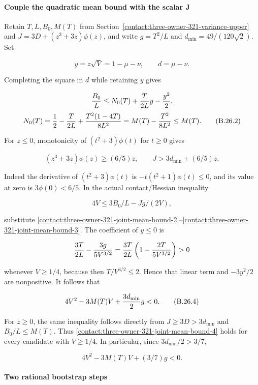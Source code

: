 \paragraph{Couple the quadratic mean bound with the scalar J}

Retain $T,L,B_0,M(T)$ from Section~\ref{contact:three-owner-321-variance-upper} and
$J=3D+(z^3+3z)\phi(z)$, and write $g=T^2/L$ and
$d_{\min}=49/(120\sqrt{2})$. Set

\[
 y=z\sqrt V=1-\mu-\nu,\qquad d=\mu-\nu.
\]

Completing the square in $d$ while retaining $y$ gives

\[
 {B_0\over L}\le N_0(T)+{T\over2L}y-{y^2\over2},
\]
\[
 N_0(T)={1\over2}-{T\over2L}+{T^2(1-4T)\over8L^2}
 =M(T)-{T^2\over8L^2}\le M(T).
\tag{B.26.2}\label{contact:three-owner-321-joint-mean-bound-2}
\]

For $z\le 0$, monotonicity of $(t^2+3)\phi(t)$ for $t\ge 0$ gives

\[
 (z^3+3z)\phi(z)\ge(6/5)z,
 \qquad J>3d_{\min}+(6/5)z.
\tag{B.26.3}\label{contact:three-owner-321-joint-mean-bound-3}
\]

Indeed the derivative of $(t^2+3)\phi(t)$ is
$-t(t^2+1)\phi(t)\le 0$, and its value at zero is $3\phi(0)<6/5$.
In the actual contact/Hessian inequality

\[
 4V\le3B_0/L-Jg/(2V),
\]

substitute \eqref{contact:three-owner-321-joint-mean-bound-2}--\eqref{contact:three-owner-321-joint-mean-bound-3}. The coefficient of $y\le 0$ is

\[
 {3T\over2L}-{3g\over5V^{3/2}}
 ={3T\over2L}\left(1-{2T\over5V^{3/2}}\right)>0
\]

whenever $V\ge 1/4$, because then $T/V^{3/2}\le 2$. Hence that linear term
and $-3y^2/2$ are nonpositive. It follows that

\[
 4V^2-3M(T)V+{3d_{\min}\over2}g<0.
\tag{B.26.4}\label{contact:three-owner-321-joint-mean-bound-4}
\]

For $z\ge 0$, the same inequality follows directly from $J\ge 3D>3d_{\min}$
and $B_0/L\le M(T)$. Thus \eqref{contact:three-owner-321-joint-mean-bound-4} holds for every candidate with $V\ge 1/4$.
In particular, since $3d_{\min}/2>3/7$,

\[
 4V^2-3M(T)V+(3/7)g<0.
\tag{B.26.5}\label{contact:three-owner-321-joint-mean-bound-5}
\]

\paragraph{Two rational bootstrap steps}

